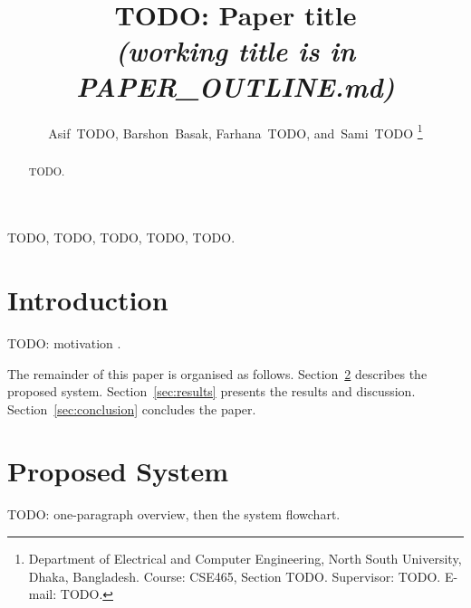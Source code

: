 \documentclass[journal,onecolumn]{IEEEtran}
\begin{document}
\title{TODO: Paper title\\
{\normalsize\itshape (working title is in PAPER\_OUTLINE.md)}}

\author{Asif~TODO,
        Barshon~Basak,
        Farhana~TODO,
        and~Sami~TODO%
\thanks{Department of Electrical and Computer Engineering, North South
University, Dhaka, Bangladesh. Course: CSE465, Section TODO.
Supervisor: TODO. E-mail: TODO.}}

\maketitle

\begin{abstract}
TODO.
\end{abstract}

\begin{IEEEkeywords}
TODO, TODO, TODO, TODO, TODO.
\end{IEEEkeywords}

\section{Introduction}
\label{sec:intro}

TODO: motivation \cite{ref1}.

The remainder of this paper is organised as follows. Section~\ref{sec:proposed}
describes the proposed system. Section~\ref{sec:results} presents the results
and discussion. Section~\ref{sec:conclusion} concludes the paper.

\section{Proposed System}
\label{sec:proposed}
TODO: one-paragraph overview, then the system flowchart.
\end{document}
